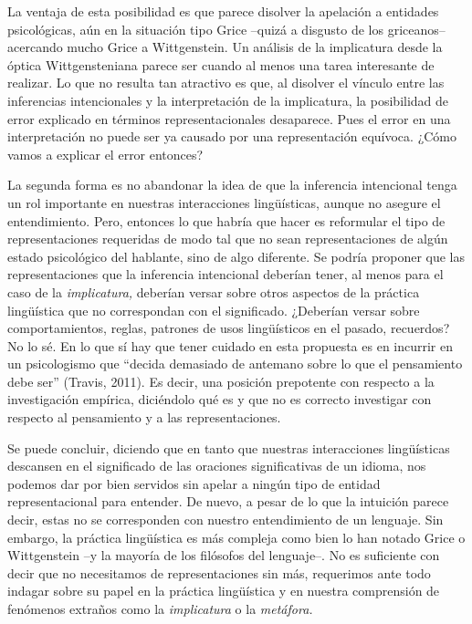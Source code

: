 \documentclass[]{book}
\begin{document}
La ventaja de esta posibilidad es que parece disolver la apelación a
entidades psicológicas, aún en la situación tipo Grice --quizá a
disgusto de los griceanos-- acercando mucho Grice a Wittgenstein. Un
análisis de la implicatura desde la óptica Wittgensteniana parece ser
cuando al menos una tarea interesante de realizar. Lo que no resulta tan
atractivo es que, al disolver el vínculo entre las inferencias
intencionales y la interpretación de la implicatura, la posibilidad de
error explicado en términos representacionales desaparece. Pues el error
en una interpretación no puede ser ya causado por una representación
equívoca. ¿Cómo vamos a explicar el error entonces?

La segunda forma es no abandonar la idea de que la inferencia
intencional tenga un rol importante en nuestras interacciones
lingüísticas, aunque no asegure el entendimiento. Pero, entonces lo que
habría que hacer es reformular el tipo de representaciones requeridas de
modo tal que no sean representaciones de algún estado psicológico del
hablante, sino de algo diferente. Se podría proponer que las
representaciones que la inferencia intencional deberían tener, al menos
para el caso de la \emph{implicatura,} deberían versar sobre otros
aspectos de la práctica lingüística que no correspondan con el
significado. ¿Deberían versar sobre comportamientos, reglas, patrones de
usos lingüísticos en el pasado, recuerdos? No lo sé. En lo que sí hay
que tener cuidado en esta propuesta es en incurrir en un psicologismo
que ``decida demasiado de antemano sobre lo que el pensamiento debe
ser'' (Travis, 2011). Es decir, una posición prepotente con respecto a
la investigación empírica, diciéndolo qué es y que no es correcto
investigar con respecto al pensamiento y a las representaciones.

Se puede concluir, diciendo que en tanto que nuestras interacciones
lingüísticas descansen en el significado de las oraciones significativas
de un idioma, nos podemos dar por bien servidos sin apelar a ningún tipo
de entidad representacional para entender. De nuevo, a pesar de lo que
la intuición parece decir, estas no se corresponden con nuestro
entendimiento de un lenguaje. Sin embargo, la práctica lingüística es
más compleja como bien lo han notado Grice o Wittgenstein --y la mayoría
de los filósofos del lenguaje--. No es suficiente con decir que no
necesitamos de representaciones sin más, requerimos ante todo indagar
sobre su papel en la práctica lingüística y en nuestra comprensión de
fenómenos extraños como la \emph{implicatura} o la \emph{metáfora. }
\end{document}
